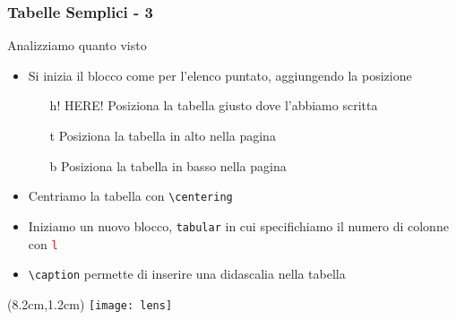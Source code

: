 \begin{frame}
  \frametitle{Tabelle Semplici - 3}
  
  Analizziamo quanto visto
  \begin{itemize}
   \item<2-> Si inizia il blocco come per l'elenco puntato, aggiungendo la 
posizione
   \begin{itemize}
    \item[h!] HERE! Posiziona la tabella giusto dove l'abbiamo scritta
    \item[t] Posiziona la tabella in alto nella pagina
    \item[b] Posiziona la tabella in basso nella pagina
   \end{itemize}

   \item<3-> Centriamo la tabella con \texttt{\textbackslash centering}
   \item<4-> Iniziamo un nuovo blocco, \texttt{tabular} in cui specifichiamo il 
numero di colonne con \texttt{\textcolor{red}{l}}
   \item<5-> \texttt{\textbackslash caption} permette di inserire una 
didascalia nella tabella
  \end{itemize}
  
  \begin{textblock*}{5cm}(8.2cm,1.2cm)
   \texttt{[image: lens]}
  \end{textblock*}

\end{frame}
